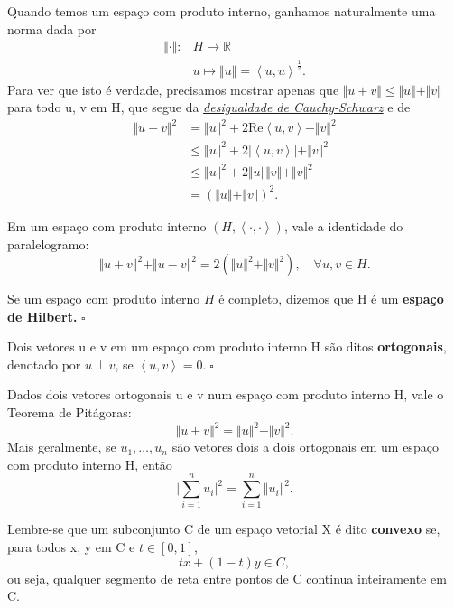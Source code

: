 \documentclass[../functional_analysis.tex]{subfiles}
\begin{document}
Quando temos um espaço com produto interno, ganhamos naturalmente uma norma dada por
\begin{align*}
	\Vert \cdot  \Vert: & H\rightarrow \mathbb{R}                                         \\
	                    & u\longmapsto \Vert u \Vert = \left< u, u \right>^{\frac{1}{2}}.
\end{align*}
Para ver que isto é verdade, precisamos mostrar apenas que \(\Vert u + v \Vert\leq \Vert u \Vert + \Vert v \Vert\) para todo u, v em H, que segue da \hyperlink{cauchy_schwarz}{\textit{desigualdade de Cauchy-Schwarz}} e de
\begin{align*}
	\Vert u+v \Vert^{2} & = \Vert u \Vert^{2} + 2 \mathrm{Re}\left< u, v \right> + \Vert v \Vert^{2} \\
	                    & \leq \Vert u \Vert^{2} + 2 | \left< u, v \right> | + \Vert v \Vert^{2}     \\
	                    & \leq \Vert u \Vert^{2} + 2 \Vert u \Vert\Vert v \Vert + \Vert v \Vert^{2}  \\
	                    & = (\Vert u \Vert + \Vert v \Vert)^{2}.
\end{align*}

\hypertarget{parallelogram_identity}{\begin{lemma*}
		Em um espaço com produto interno \((H, \left< \cdot , \cdot  \right>)\), vale a identidade do paralelogramo:
		\[
			\Vert u + v \Vert^{2} + \Vert u-v \Vert^{2} = 2(\Vert u \Vert^{2} + \Vert v \Vert^{2}),\quad \forall u, v\in H.
		\]
	\end{lemma*}}
\begin{def*}
	Se um espaço com produto interno \(H\) é completo, dizemos que H é um \textbf{espaço de Hilbert.} \(\square\)
\end{def*}
\begin{def*}
	Dois vetores u e v em um espaço com produto interno H são ditos \textbf{ortogonais}, denotado por \(u\perp v\), se \(\left< u, v \right> = 0.\; \square\)
\end{def*}
\hypertarget{pythagorean_theorem}{\begin{theorem*}
		Dados dois vetores ortogonais u e v num espaço com produto interno H, vale o Teorema de Pitágoras:
		\[
			\Vert u + v \Vert^{2} = \Vert u \Vert^{2} + \Vert v \Vert^{2}.
		\]
		Mais geralmente, se \(u_1, \dotsc , u_{n}\) são vetores dois a dois ortogonais em um espaço com produto interno H, então
		\[
			\biggl\vert \sum\limits_{i=1}^{n}u_{i} \biggr\vert^{2} = \sum\limits_{i=1}^{n}\Vert u_{i} \Vert^{2}.
		\]
	\end{theorem*}}
\begin{tcolorbox}[
		skin=enhanced,
		title=Lembrete!,
		after title={\hfill Conjuntos Convexos},
		fonttitle=\bfseries,
		sharp corners=downhill,
		colframe=black,
		colbacktitle=yellow!75!white,
		colback=yellow!30,
		colbacklower=black,
		coltitle=black,
		drop large lifted shadow
	]
	Lembre-se que um subconjunto C de um espaço vetorial X é dito \textbf{convexo} se, para todos x, y em C e \(t\in [0, 1]\),
	\[
		tx + (1-t)y\in C,
	\]
	ou seja, qualquer segmento de reta entre pontos de C continua inteiramente em C.
\end{tcolorbox}
\end{document}
